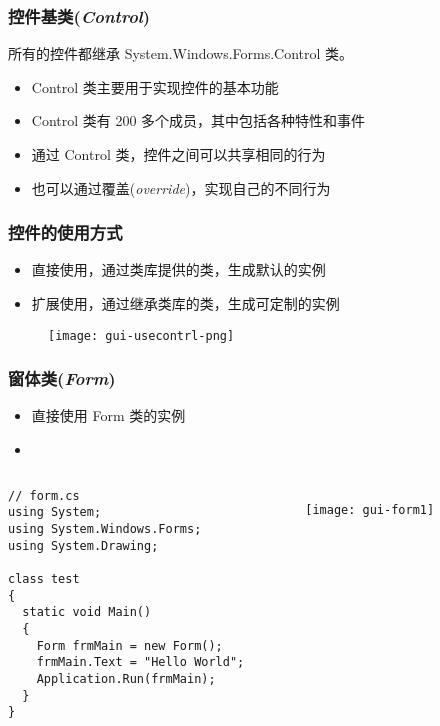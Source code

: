 \begin{frame}[fragile]
\frametitle{控件基类(\textit{Control})}
所有的控件都继承 System.Windows.Forms.Control 类。
\begin{itemize}
\item Control 类主要用于实现控件的基本功能
\item Control 类有 200 多个成员，其中包括各种特性和事件
\item 通过 Control 类，控件之间可以共享相同的行为
\item 也可以通过{\redwarn 覆盖}(\textit{override})，实现自己的不同行为
\end{itemize}
\begin{figure}[htbp]
  \centering
  
\end{figure}
\end{frame}

\begin{frame}[fragile]
\frametitle{控件的使用方式}
\begin{itemize}
\item 直接使用，通过类库提供的类，生成默认的实例
\item 扩展使用，通过继承类库的类，生成可定制的实例
\end{itemize}
\begin{figure}[htbp]
  \centering
  \texttt{[image: gui-usecontrl-png]}
\end{figure}
\end{frame}

\begin{frame}[fragile]
\frametitle{窗体类(\textit{Form})}
\begin{itemize}
\item 直接使用 Form 类的实例
\item {}
\end{itemize}
\begin{columns}[t]
\begin{lstlisting}
// form.cs
using System;
using System.Windows.Forms;
using System.Drawing;

class test
{
  static void Main()
  {
    Form frmMain = new Form();
    frmMain.Text = "Hello World";
    Application.Run(frmMain);
  }
}
\end{lstlisting}
\begin{figure}[htbp]
  \centering
  \texttt{[image: gui-form1]}
\end{figure}
\end{columns}
\end{frame}

